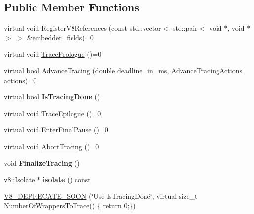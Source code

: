 \subsection*{Public Member Functions}
\begin{DoxyCompactItemize}
\item 
virtual void \mbox{\hyperlink{classv8_1_1EmbedderHeapTracer_a849c52f45fbfe1fd30664031898bf0d8}{Register\+V8\+References}} (const std\+::vector$<$ std\+::pair$<$ void $\ast$, void $\ast$$>$ $>$ \&embedder\+\_\+fields)=0
\item 
virtual void \mbox{\hyperlink{classv8_1_1EmbedderHeapTracer_af4f747aa1d77a0d2f341846b94f6b1ce}{Trace\+Prologue}} ()=0
\item 
virtual bool \mbox{\hyperlink{classv8_1_1EmbedderHeapTracer_a33e9ab6a32d22aa104ccdfac9a023ddb}{Advance\+Tracing}} (double deadline\+\_\+in\+\_\+ms, \mbox{\hyperlink{structv8_1_1EmbedderHeapTracer_1_1AdvanceTracingActions}{Advance\+Tracing\+Actions}} actions)=0
\item 
\mbox{\label{classv8_1_1EmbedderHeapTracer_afbae420dc5bfc113c5c18a2c1e5af482}} 
virtual bool {\bfseries Is\+Tracing\+Done} ()
\item 
virtual void \mbox{\hyperlink{classv8_1_1EmbedderHeapTracer_a61b8dc3260247e2c47af8ad8f5775991}{Trace\+Epilogue}} ()=0
\item 
virtual void \mbox{\hyperlink{classv8_1_1EmbedderHeapTracer_a802d0e71f8b360c1391d166f32caf098}{Enter\+Final\+Pause}} ()=0
\item 
virtual void \mbox{\hyperlink{classv8_1_1EmbedderHeapTracer_a997b79af3a065c17868638bfc0c0a0ab}{Abort\+Tracing}} ()=0
\item 
\mbox{\label{classv8_1_1EmbedderHeapTracer_a1828fe003680e216a5111a63cd3b6149}} 
void {\bfseries Finalize\+Tracing} ()
\item 
\mbox{\label{classv8_1_1EmbedderHeapTracer_a7d0d7438df5ed1bf18287c7d6253d276}} 
\mbox{\hyperlink{classv8_1_1Isolate}{v8\+::\+Isolate}} $\ast$ {\bfseries isolate} () const
\item 
\mbox{\hyperlink{classv8_1_1EmbedderHeapTracer_a1ee993c45a50443baa7b3ad036f9e1fa}{V8\+\_\+\+D\+E\+P\+R\+E\+C\+A\+T\+E\+\_\+\+S\+O\+ON}} (\char`\"{}Use Is\+Tracing\+Done\char`\"{}, virtual size\+\_\+t Number\+Of\+Wrappers\+To\+Trace() \{ return 0;\})
\end{DoxyCompactItemize}
